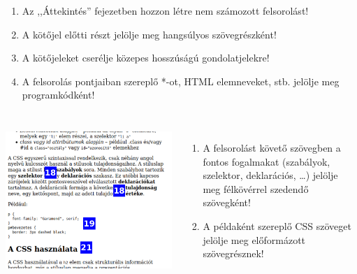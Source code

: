 \begin{frame}
\begin{columns}[c]
\begin{enumerate}
        \item Az ,,Áttekintés'' fejezetben hozzon létre nem számozott felsorolást!
        \item A kötőjel előtti részt jelölje meg hangsúlyos szövegrészként!
        \item A kötőjeleket cserélje közepes hosszúságú gondolatjelekre!
        \item A felsorolás pontjaiban szereplő *-ot, HTML elemneveket, stb. jelölje meg programkódként!
        \setcounter{feladatSzamlalo}{\theenumi}
      \end{enumerate}
  \end{columns}
\end{frame}

\begin{frame}
  \begin{columns}[c]
      \begin{exampleblock}{}
        \includegraphics[width=\textwidth]{css3.pdf}
      \end{exampleblock}
      \begin{enumerate}
        \setcounter{enumi}{\thefeladatSzamlalo}
        \item A felsorolást követő szövegben a fontos fogalmakat (szabályok, szelektor, deklarációs, \dots) jelölje meg félkövérrel szedendő szövegként!
        \item A példaként szereplő CSS szöveget jelölje meg előformázott szövegrésznek!

\end{enumerate}
\end{columns}
\end{frame}
